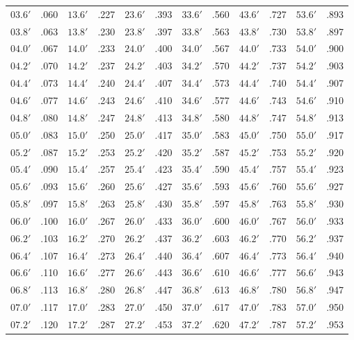 \begin{table}
{\begin{tabular}{ll|ll|ll|ll|ll|ll}
$03.6'$ & .060 & $13.6'$ & .227 & $23.6'$ & .393 & $33.6'$ & .560 & $43.6'$ & .727 & $53.6'$ & .893\\
$03.8'$ & .063 & $13.8'$ & .230 & $23.8'$ & .397 & $33.8'$ & .563 & $43.8'$ & .730 & $53.8'$ & .897\\
$04.0'$ & .067 & $14.0'$ & .233 & $24.0'$ & .400 & $34.0'$ & .567 & $44.0'$ & .733 & $54.0'$ & .900\\
$04.2'$ & .070 & $14.2'$ & .237 & $24.2'$ & .403 & $34.2'$ & .570 & $44.2'$ & .737 & $54.2'$ & .903\\
$04.4'$ & .073 & $14.4'$ & .240 & $24.4'$ & .407 & $34.4'$ & .573 & $44.4'$ & .740 & $54.4'$ & .907\\
$04.6'$ & .077 & $14.6'$ & .243 & $24.6'$ & .410 & $34.6'$ & .577 & $44.6'$ & .743 & $54.6'$ & .910\\
$04.8'$ & .080 & $14.8'$ & .247 & $24.8'$ & .413 & $34.8'$ & .580 & $44.8'$ & .747 & $54.8'$ & .913\\
$05.0'$ & .083 & $15.0'$ & .250 & $25.0'$ & .417 & $35.0'$ & .583 & $45.0'$ & .750 & $55.0'$ & .917\\
$05.2'$ & .087 & $15.2'$ & .253 & $25.2'$ & .420 & $35.2'$ & .587 & $45.2'$ & .753 & $55.2'$ & .920\\
$05.4'$ & .090 & $15.4'$ & .257 & $25.4'$ & .423 & $35.4'$ & .590 & $45.4'$ & .757 & $55.4'$ & .923\\
$05.6'$ & .093 & $15.6'$ & .260 & $25.6'$ & .427 & $35.6'$ & .593 & $45.6'$ & .760 & $55.6'$ & .927\\
$05.8'$ & .097 & $15.8'$ & .263 & $25.8'$ & .430 & $35.8'$ & .597 & $45.8'$ & .763 & $55.8'$ & .930\\
$06.0'$ & .100 & $16.0'$ & .267 & $26.0'$ & .433 & $36.0'$ & .600 & $46.0'$ & .767 & $56.0'$ & .933\\
$06.2'$ & .103 & $16.2'$ & .270 & $26.2'$ & .437 & $36.2'$ & .603 & $46.2'$ & .770 & $56.2'$ & .937\\
$06.4'$ & .107 & $16.4'$ & .273 & $26.4'$ & .440 & $36.4'$ & .607 & $46.4'$ & .773 & $56.4'$ & .940\\
$06.6'$ & .110 & $16.6'$ & .277 & $26.6'$ & .443 & $36.6'$ & .610 & $46.6'$ & .777 & $56.6'$ & .943\\
$06.8'$ & .113 & $16.8'$ & .280 & $26.8'$ & .447 & $36.8'$ & .613 & $46.8'$ & .780 & $56.8'$ & .947\\
$07.0'$ & .117 & $17.0'$ & .283 & $27.0'$ & .450 & $37.0'$ & .617 & $47.0'$ & .783 & $57.0'$ & .950\\
$07.2'$ & .120 & $17.2'$ & .287 & $27.2'$ & .453 & $37.2'$ & .620 & $47.2'$ & .787 & $57.2'$ & .953\\

\end{tabular}}
\end{table}
